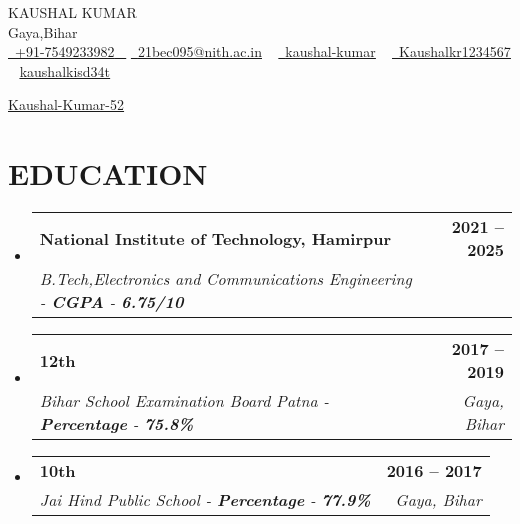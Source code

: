 \documentclass[letterpaper,11pt]{article}
\makeatletter
\newcommand{\resumeSubheading}[4]{
  \vspace{-2pt}\item
    \begin{tabular*}{1.0\textwidth}[t]{l@{\extracolsep{\fill}}r}
      \textbf{\large#1} & \textbf{\small #2} \\
      \textit{\large#3} & \textit{\small #4} \\
     
    \end{tabular*}\vspace{-9pt}
}
\newcommand{\resumeSubHeadingListStart}{\begin{itemize}[leftmargin=0.0in, label={}]}
\newcommand{\resumeSubHeadingListEnd}{\end{itemize}}
\makeatother
\begin{document}




\begin{center}
    {\Huge \scshape KAUSHAL KUMAR} \\ \vspace{3pt}
    Gaya,Bihar \\ \vspace{3pt}
    \small \href{tel:+xxxxxxxxxxxx}{ \raisebox{-0.1\height}\faPhone\ \underline{+91-7549233982} ~} \href{mailto:yourname@gmail.com}{\raisebox{-0.2\height}\faEnvelope\  \underline{21bec095@nith.ac.in}} ~
    \href{https://www.linkedin.com/in/kaushal-kumar-648434230?utm_source=share&utm_campaign=share_via&utm_content=profile&utm_medium=android_app}{\raisebox{-0.2\height}\faLinkedinSquare\ \underline{kaushal-kumar}}  ~
    \href{https://https://github.com/Kaushalkr1234567}{\raisebox{-0.2\height}\faGithub\ \underline{Kaushalkr1234567}} ~
   \href{https://www.geeksforgeeks.org/user/kaushalkisd34t/}{ \underline{kaushalkisd34t}}

\href{https://www.researchgate.net/profile/Kaushal-Kumar-52}{ \underline{Kaushal-Kumar-52}}
 
    \vspace{-8pt}
\end{center}




\section{EDUCATION}
  \resumeSubHeadingListStart
    \resumeSubheading
      {National Institute of Technology, Hamirpur}{2021 -- 2025}
      {B.Tech,Electronics and Communications Engineering - \textbf{CGPA} - \textbf{6.75/10}}{}
  \resumeSubHeadingListEnd
 
  \resumeSubHeadingListStart
    \resumeSubheading
      {12th}{2017 -- 2019}
      {Bihar School Examination Board Patna   - \textbf{Percentage} - \textbf{75.8\%}}{Gaya, Bihar}
  \resumeSubHeadingListEnd
  
 \resumeSubHeadingListStart
    \resumeSubheading
      {10th}{2016 -- 2017}
      {Jai Hind Public School  - \textbf{Percentage} - \textbf{77.9\%}}{Gaya, Bihar}
  \resumeSubHeadingListEnd

\end{document}
